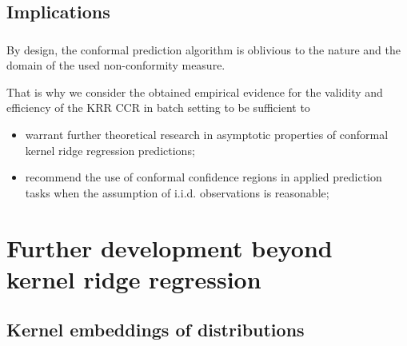 \documentclass[t]{beamer}  %
\begin{document}


\subsection{Implications} %
\label{sub:implications}

\begin{frame}[c]\frametitle{\insertsection}
  \framesubtitle{\insertsubsection}
  By design, the conformal prediction algorithm is oblivious to the nature and
  the domain of the used non-conformity measure.

  That is why we consider the obtained empirical evidence for the validity and
  efficiency of the KRR CCR in batch setting to be sufficient to \begin{itemize}
    \item warrant further theoretical research in asymptotic properties of conformal
    kernel ridge regression predictions;
    \item recommend the use of conformal confidence regions in applied prediction
    tasks when the assumption of i.i.d. observations is reasonable;
  \end{itemize}
\end{frame}



\section{Further development beyond kernel ridge regression} %
\label{sec:further_development_beyond_krr}

\subsection{Kernel embeddings of distributions} %
\label{sub:kernel_embeddings_of_distributions}
\end{document}
